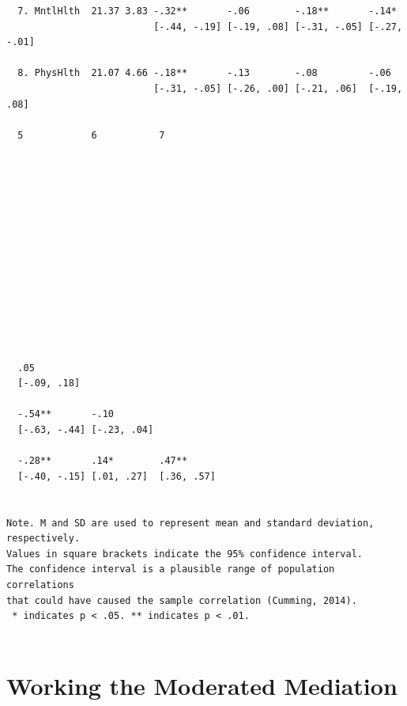 \documentclass[
]{book}
\begin{document}
\begin{verbatim}
  7. MntlHlth  21.37 3.83 -.32**       -.06        -.18**       -.14*       
                          [-.44, -.19] [-.19, .08] [-.31, -.05] [-.27, -.01]
                                                                            
  8. PhysHlth  21.07 4.66 -.18**       -.13        -.08         -.06        
                          [-.31, -.05] [-.26, .00] [-.21, .06]  [-.19, .08] 
                                                                            
  5            6           7         
                                     
                                     
                                     
                                     
                                     
                                     
                                     
                                     
                                     
                                     
                                     
                                     
                                     
                                     
  .05                                
  [-.09, .18]                        
                                     
  -.54**       -.10                  
  [-.63, -.44] [-.23, .04]           
                                     
  -.28**       .14*        .47**     
  [-.40, -.15] [.01, .27]  [.36, .57]
                                     

Note. M and SD are used to represent mean and standard deviation, respectively.
Values in square brackets indicate the 95% confidence interval.
The confidence interval is a plausible range of population correlations 
that could have caused the sample correlation (Cumming, 2014).
 * indicates p < .05. ** indicates p < .01.
 
\end{verbatim}

\hypertarget{working-the-moderated-mediation}{%
\section{Working the Moderated Mediation}\label{working-the-moderated-mediation}}
\end{document}
